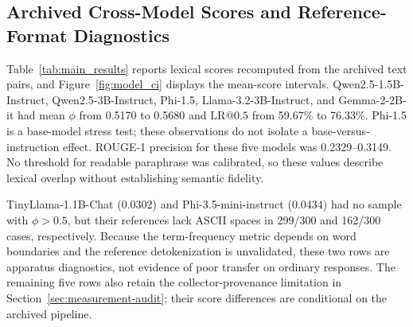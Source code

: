 \documentclass[electronics,article,submit,pdftex,moreauthors]{Definitions/mdpi}
\begin{document}
\begin{table}[ht]
\centering
\caption{Partial trace ablations using logged token-byte lengths from the 96-token pilot ($n=30$ prompts per model and condition). The documented recipe decodes up to three heuristic segments, with 80-token T5 input and output limits, and scores their concatenation against the full stored response. Intervals are percentile-bootstrap 95\% confidence intervals for the mean.}
\label{tab:trace_controls}
\end{table}

\subsection{Archived Cross-Model Scores and Reference-Format Diagnostics}
Table~\ref{tab:main_results} reports lexical scores recomputed from the archived text pairs, and Figure~\ref{fig:model_ci} displays the mean-score intervals. Qwen2.5-1.5B-Instruct, Qwen2.5-3B-Instruct, Phi-1.5, Llama-3.2-3B-Instruct, and Gemma-2-2B-it had mean $\phi$ from 0.5170 to 0.5680 and $\mathrm{LR}@0.5$ from 59.67\% to 76.33\%. Phi-1.5 is a base-model stress test; these observations do not isolate a base-versus-instruction effect. ROUGE-1 precision for these five models was 0.2329--0.3149. No threshold for readable paraphrase was calibrated, so these values describe lexical overlap without establishing semantic fidelity.

TinyLlama-1.1B-Chat (0.0302) and Phi-3.5-mini-instruct (0.0434) had no sample with $\phi>0.5$, but their references lack ASCII spaces in 299/300 and 162/300 cases, respectively. Because the term-frequency metric depends on word boundaries and the reference detokenization is unvalidated, these two rows are apparatus diagnostics, not evidence of poor transfer on ordinary responses. The remaining five rows also retain the collector-provenance limitation in Section~\ref{sec:measurement-audit}; their score differences are conditional on the archived pipeline.
\end{document}
